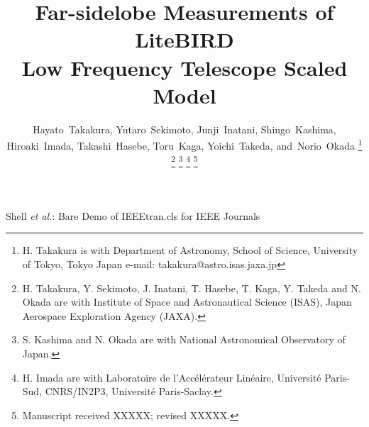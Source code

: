 \documentclass[journal]{IEEEtran}
\begin{document}
%
\title{Far-sidelobe Measurements of LiteBIRD \\ Low Frequency Telescope Scaled Model}
%
%
\author{Hayato~Takakura, Yutaro~Sekimoto, Junji~Inatani, Shingo~Kashima, Hiroaki~Imada, Takashi~Hasebe, Toru~Kaga, Yoichi~Takeda, and~Norio~Okada%
\thanks{H. Takakura is with Department of Astronomy, School of Science, University of Tokyo, Tokyo Japan e-mail: takakura@astro.isas.jaxa.jp}%
\thanks{H. Takakura, Y. Sekimoto, J. Inatani, T. Hasebe, T. Kaga, Y. Takeda and N. Okada are with Institute of Space and Astronautical Science (ISAS), Japan Aerospace Exploration Agency (JAXA).}%
\thanks{S. Kashima and N. Okada are with National Astronomical Observatory of Japan.}%
\thanks{H. Imada are with Laboratoire de l'Accélérateur Linéaire, Université Paris-Sud, CNRS/IN2P3, Université Paris-Saclay.}%
\thanks{Manuscript received XXXXX; revised XXXXX.}}
%
%
{Shell \MakeLowercase{\textit{et al.}}: Bare Demo of IEEEtran.cls for IEEE Journals}
% 
%
%
%
\maketitle
%
\end{document}
